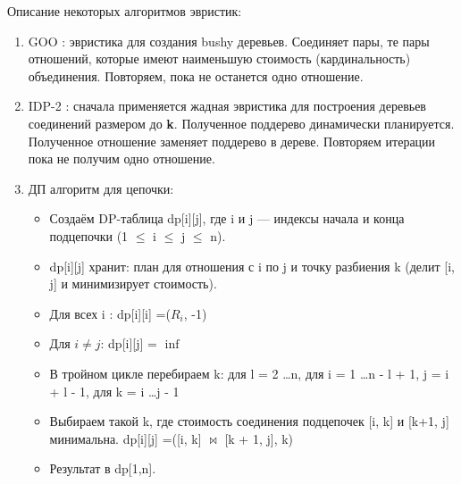 \documentclass[12pt]{article}
\begin{document}
\begin{flushleft}
Описание некоторых алгоритмов эвристик:
\begin{enumerate}
    \item GOO \cite{MoerGOO}: эвристика для создания bushy деревьев. Соединяет пары, те пары отношений, которые имеют наименьшую стоимость (кардинальность) объединения. 
    Повторяем, пока не останется одно отношение.
    \item IDP-2 \cite{IDP}: сначала применяется жадная эвристика для построения деревьев соединений размером до \textbf{k}. 
    Полученное поддерево динамически планируется. Полученное отношение заменяет поддерево в дереве. Повторяем итерации пока не получим одно отношение.
    \item ДП алгоритм для цепочки: 
    \begin{itemize}[label={}]
        \item Создаём DP-таблица dp[i][j], где i и j — индексы начала и конца подцепочки (1 $\le$ i $\le$ j $\le$ n).
        \item dp[i][j] хранит: план для отношения с i по j и точку разбиения k (делит [i, j] и минимизирует стоимость).
        \item Для всех i : dp[i][i] =($R_i$, -1)
        \item Для $i \ne j$: dp[i][j] = $\inf$
        \item В тройном цикле перебираем k: для l = 2 \dots n, для i = 1 \dots n - l + 1, j = i + l - 1, для k = i \dots j - 1
        \item Выбираем такой k, где стоимость соединения подцепочек [i, k] и [k+1, j] минимальна. dp[i][j] =([i, k] $\bowtie$ [k + 1, j], k)
        \item Результат в dp[1,n].
    \end{itemize}
\end{enumerate}

\centering 

\raggedright

\end{flushleft}
\end{document}

